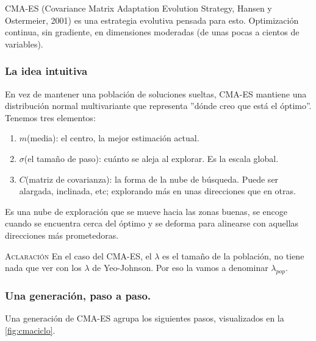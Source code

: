 CMA-ES (Covariance Matrix Adaptation Evolution Strategy, Hansen y Ostermeier, 2001) es una estrategia evolutiva pensada para esto. Optimización continua, sin gradiente, en dimensiones moderadas (de unas pocas a cientos de variables). 

\subsubsection{La idea intuitiva}
En vez de mantener una población de soluciones sueltas, CMA-ES mantiene una distribución normal multivariante que representa ''dónde creo que está el óptimo''. Tenemos tres elementos: 
\begin{enumerate}
    \item $m$(media): el centro, la mejor estimación actual. 
    \item $\sigma$(el tamaño de paso): cuánto se aleja al explorar. Es la escala global. 
    \item $C$(matriz de covarianza): la forma de la nube de búsqueda. Puede ser alargada, inclinada, etc; explorando más en unas direcciones que en otras.
\end{enumerate}

Es una nube de exploración que se mueve hacia las zonas buenas, se encoge cuando se encuentra cerca del óptimo y se deforma para alinearse con aquellas direcciones más prometedoras. 

\textsc{Aclaración} En el caso del CMA-ES, el $\lambda$ es el tamaño de la población, no tiene nada que  ver con los $\lambda$ de Yeo-Johnson. Por eso la vamos a denominar $\lambda_{pop}$. 

\subsubsection{Una generación, paso a paso.}

Una generación de CMA-ES agrupa los siguientes pasos, visualizados en la \autoref{fig:cmaciclo}.

